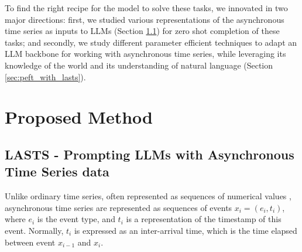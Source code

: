 To find the right recipe for the model to solve these tasks, we innovated in two major directions: first, we  studied various representations of the asynchronous time series as inputs to LLMs (Section \ref{ATSrepresentation}) for zero shot completion of these tasks; and secondly, we study different parameter efficient techniques to adapt an LLM backbone for working with asynchronous time series, while leveraging its knowledge of the world and its understanding of natural language (Section \ref{sec:peft_with_lasts}). %


\section{Proposed Method}


\subsection{\textbf{LASTS} - Prompting LLMs with Asynchronous Time Series data} \label{ATSrepresentation} 

\begin{comment}
One of our key contributions is the exploration of different methods to represent asynchronous time series data for various tasks.    
\end{comment} 
Unlike ordinary time series, often represented as sequences of numerical values \citep{Gruver2023Large},  asynchronous time series are represented as sequences of events $x_i = (e_i, t_i)$, where $e_i$ is the event type, and $t_i$ is a representation of the timestamp of this event.  Normally, $t_i$ is expressed as an inter-arrival time, which is the time elapsed between event $x_{i-1}$ and $x_i$.





